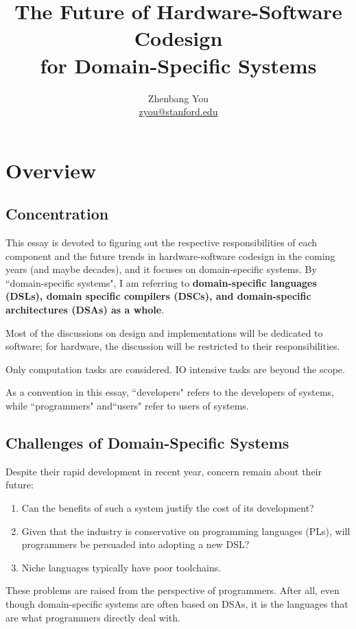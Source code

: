 \documentclass[11pt]{article}
\title{The Future of Hardware-Software Codesign\\for Domain-Specific Systems}
\author{Zhenbang You\\ \href{zyou@stanford.edu}{zyou@stanford.edu}}
\date{}
\begin{document}
\maketitle

\section{Overview}

\subsection{Concentration}
This essay is devoted to figuring out the respective responsibilities of each component and the future trends in hardware-software codesign in the coming years (and maybe decades), and it focuses on domain-specific systems.
By ``domain-specific systems", I am referring to \textbf{domain-specific languages (DSLs), domain specific compilers (DSCs), and domain-specific architectures (DSAs) as a whole}.

Most of the discussions on design and implementations will be dedicated to software;  for hardware, the discussion will be restricted to their responsibilities.

Only computation tasks are considered.
IO intensive tasks are beyond the scope.

As a convention in this essay, ``developers" refers to the developers of systems, while ``programmers" and``users" refer to users of systems.

\subsection{Challenges of Domain-Specific Systems}
Despite their rapid development in recent year, concern remain about their future:
\begin{enumerate}
    \item Can the benefits of such a system justify the cost of its development?
    \item Given that the industry is conservative on programming languages (PLs), will programmers be persuaded into adopting a new DSL?
    \item Niche languages typically have poor toolchains.
\end{enumerate}
These problems are raised from the perspective of programmers.
After all, even though domain-specific systems are often based on DSAs, it is the languages that are what programmers directly deal with.
\end{document}
